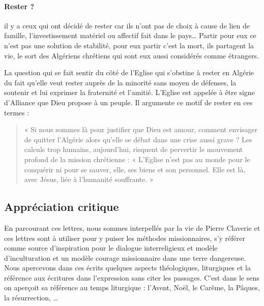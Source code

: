 \paragraph{Rester ? }
 il y a ceux qui ont décidé de rester car ils n’ont pas de choix à cause de lien de famille, l’investissement matériel ou affectif fait dans le pays… Partir pour eux ce n’est pas une solution de stabilité, pour eux partir c’est la mort, ils partagent la vie, le sort des Algériens chrétiens qui sont eux aussi considérés comme étrangers. 
 
La question qui se fait sentir du côté de l’Eglise qui s’obstine à rester en Algérie du fait qu’elle veut rester auprès de la minorité sans moyen de défenses, la soutenir et lui exprimer la fraternité et l’amitié. L’Eglise est appelée à être signe d’Alliance que Dieu propose à un peuple. Il argumente ce motif de rester en ces termes : \begin{quote}
    « Si nous sommes là pour justifier que Dieu est amour, comment envisager de quitter l’Algérie alors qu’elle se débat dans une crise aussi grave ? Les calculs trop humains, aujourd’hui, risquent de pervertir le mouvement profond de la mission chrétienne : « L’Eglise n’est pas au monde pour le conquérir ni pour se sauver, elle, ses biens et son personnel. Elle est là, avec Jésus, liée à l’humanité souffrante. »
\end{quote}

\subsection{Appréciation critique  }
 
                En parcourant ces lettres, nous sommes interpellés par la vie de Pierre Claverie et ces lettres sont à utiliser pour y puiser les méthodes missionnaires, s’y référer comme source d’inspiration pour le dialogue interreligieux et modèle d’inculturation et un modèle courage missionnaire dans une terre dangereuse. 
                Nous apercevons dans ces écrits quelques aspects théologiques, liturgiques et la référence aux écritures dans l’expression sans citer les passages. C’est dans le sens on aperçoit sa référence au temps liturgique : l’Avent, Noël, le Carême, la Pâques, la résurrection, …

